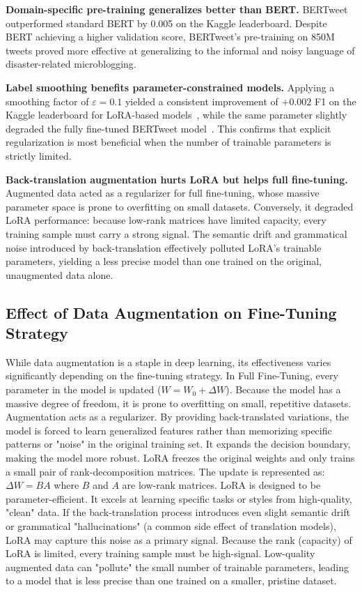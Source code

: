 \documentclass[conference]{IEEEtran}
\begin{document}
\textbf{Domain-specific pre-training generalizes better than BERT.}
BERTweet outperformed standard BERT by 0.005 on the Kaggle leaderboard. Despite BERT achieving a higher validation score, BERTweet's pre-training on 850M tweets proved more effective at generalizing to the informal and noisy language of disaster-related microblogging.

\textbf{Label smoothing benefits parameter-constrained models.}
Applying a smoothing factor of $\varepsilon = 0.1$ yielded a consistent improvement of $+0.002$ F1 on the Kaggle leaderboard for LoRA-based models~\cite{ullah2025lora}, while the same parameter slightly degraded the fully fine-tuned BERTweet model~\cite{medium_bert}. This confirms that explicit regularization is most beneficial when the number of trainable parameters is strictly limited.

\textbf{Back-translation augmentation hurts LoRA but helps
full fine-tuning.}
Augmented data acted as a regularizer for full fine-tuning, whose massive parameter space is prone to overfitting on small datasets. Conversely, it degraded LoRA performance: because low-rank matrices have limited capacity, every training sample must carry a strong signal. The semantic drift and grammatical noise introduced by back-translation effectively polluted LoRA's trainable parameters, yielding a less precise model than one trained on the original, unaugmented data alone.

\subsection{Effect of Data Augmentation on Fine-Tuning Strategy}
\label{subsec:dataaugmentation}
While data augmentation is a staple in deep learning, its effectiveness varies significantly depending on the fine-tuning strategy. In Full Fine-Tuning, every parameter in the model is updated ($W = W_0 + \Delta W$). Because the model has a massive degree of freedom, it is prone to overfitting on small, repetitive datasets. Augmentation acts as a regularizer. By providing back-translated variations, the model is forced to learn generalized features rather than memorizing specific patterns or "noise" in the original training set. It expands the decision boundary, making the model more robust. LoRA freezes the original weights and only trains a small pair of rank-decomposition matrices. The update is represented as: $\Delta W = BA$ where $B$ and $A$ are low-rank matrices. LoRA is designed to be parameter-efficient. It excels at learning specific tasks or styles from high-quality, "clean" data. If the back-translation process introduces even slight semantic drift or grammatical "hallucinations" (a common side effect of translation models), LoRA may capture this noise as a primary signal. Because the rank (capacity) of LoRA is limited, every training sample must be high-signal. Low-quality augmented data can "pollute" the small number of trainable parameters, leading to a model that is less precise than one trained on a smaller, pristine dataset.
\end{document}
